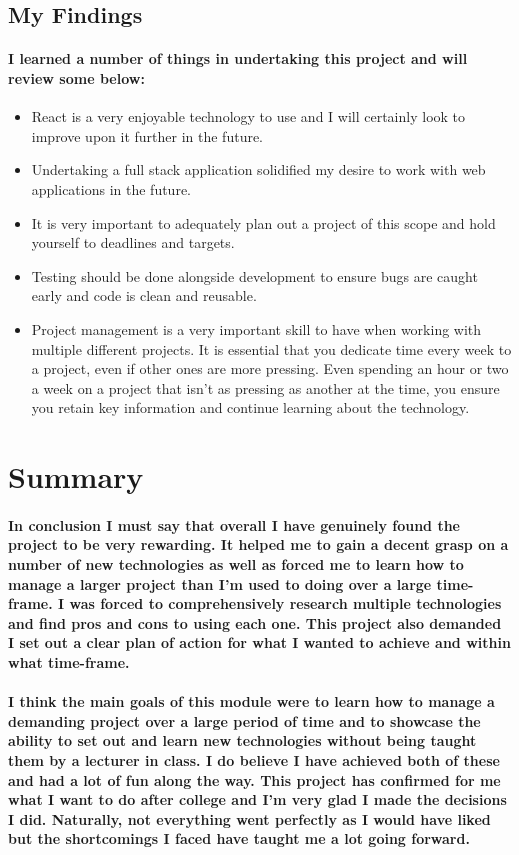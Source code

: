 \subsection{My Findings}
\paragraph{I learned a number of things in undertaking this project and will review some below:}
\begin{itemize}
    \item React is a very enjoyable technology to use and I will certainly look to improve upon it further in the future.
    \item Undertaking a full stack application solidified my desire to work with web applications in the future.
    \item It is very important to adequately plan out a project of this scope and hold yourself to deadlines and targets.
    \item Testing should be done alongside development to ensure bugs are caught early and code is clean and reusable.
    \item Project management is a very important skill to have when working with multiple different projects. It is essential that you dedicate time every week to a project, even if other ones are more pressing. Even spending an hour or two a week on a project that isn't as pressing as another at the time, you ensure you retain key information and continue learning about the technology.
\end{itemize}
\section{Summary}
\paragraph{In conclusion I must say that overall I have genuinely found the project to be very rewarding. It helped me to gain a decent grasp on a number of new technologies as well as forced me to learn how to manage a larger project than I'm used to doing over a large time-frame. I was forced to comprehensively research multiple technologies and find pros and cons to using each one. This project also demanded I set out a clear plan of action for what I wanted to achieve and within what time-frame.}
\paragraph{I think the main goals of this module were to learn how to manage a demanding project over a large period of time and to showcase the ability to set out and learn new technologies without being taught them by a lecturer in class. I do believe I have achieved both of these and had a lot of fun along the way. This project has confirmed for me what I want to do after college and I'm very glad I made the decisions I did. Naturally, not everything went perfectly as I would have liked but the shortcomings I faced have taught me a lot going forward.}